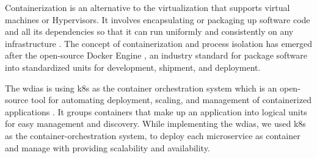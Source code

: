 



Containerization is an alternative to the virtualization that supports virtual machines or Hypervisors. It involves encapsulating or packaging up software code and all its dependencies so that it can run uniformly and consistently on any infrastructure \cite{IBMContainerizationExplained}. The concept of containerization and process isolation has emerged after the open-source Docker Engine \cite{DockerAppContainerization}, an industry standard for package software into standardized units for development, shipment, and deployment.

The \acrshort{wdias} is using \acrfull{k8s} as the container orchestration system which is an open-source tool for automating deployment, scaling, and management of containerized applications \cite{LinuxFoundationProduction-GradeKubernetes}. It groups containers that make up an application into logical units for easy management and discovery. While implementing the \acrshort{wdias}, we used \acrshort{k8s} as the container-orchestration system, to deploy each microservice as container and manage with providing scalability and availability.

